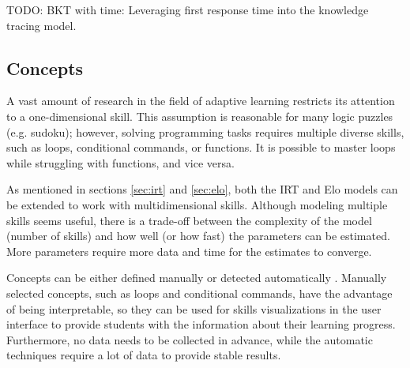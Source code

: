 TODO: BKT with time: Leveraging first response time into the knowledge tracing model.

\subsection{Concepts}


A vast amount of research in the field of adaptive learning
  restricts its attention to a one-dimensional skill.
This assumption is reasonable for many logic puzzles (e.g. sudoku);
however, solving programming tasks requires multiple diverse skills,
  such as loops, conditional commands, or functions.
It is possible to master loops while struggling with functions,
  and vice versa.

As mentioned in sections \ref{sec:irt} and \ref{sec:elo},
  both the IRT and Elo models can be extended to work with multidimensional skills.
Although modeling multiple skills seems useful,
  there is a trade-off between the complexity of the model (number of skills)
  and how well (or how fast) the parameters can be estimated.
More parameters require more data and time for the estimates to converge.



Concepts can be either defined manually or detected automatically
  \cite{niznan-thesis}.  %
Manually selected concepts, such as loops and conditional commands,
  have the advantage of being interpretable,
  so they can be used for skills visualizations in the user interface
  to provide students with the information about their learning progress.
Furthermore, no data needs to be collected in advance,
  while the automatic techniques require a lot of data to provide stable results.  %


